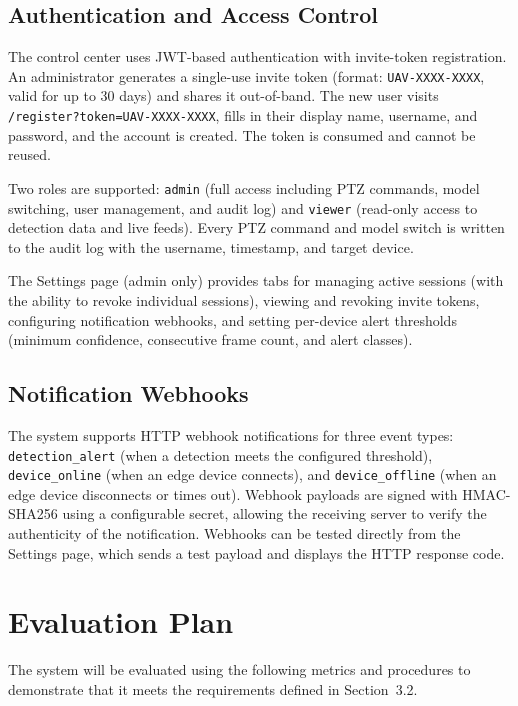 \documentclass[12pt,a4paper]{report}
\begin{document}
\subsection{Authentication and Access Control}

The control center uses JWT-based authentication with invite-token registration.
An administrator generates a single-use invite token (format: \texttt{UAV-XXXX-XXXX},
valid for up to 30 days) and shares it out-of-band. The new user visits
\texttt{/register?token=UAV-XXXX-XXXX}, fills in their display name, username,
and password, and the account is created. The token is consumed and cannot be
reused.

Two roles are supported: \texttt{admin} (full access including PTZ commands,
model switching, user management, and audit log) and \texttt{viewer}
(read-only access to detection data and live feeds). Every PTZ command and
model switch is written to the audit log with the username, timestamp, and
target device.

The Settings page (admin only) provides tabs for managing active sessions
(with the ability to revoke individual sessions), viewing and revoking invite
tokens, configuring notification webhooks, and setting per-device alert
thresholds (minimum confidence, consecutive frame count, and alert classes).

\subsection{Notification Webhooks}

The system supports HTTP webhook notifications for three event types:
\texttt{detection\_alert} (when a detection meets the configured threshold),
\texttt{device\_online} (when an edge device connects), and
\texttt{device\_offline} (when an edge device disconnects or times out).
Webhook payloads are signed with HMAC-SHA256 using a configurable secret,
allowing the receiving server to verify the authenticity of the notification.
Webhooks can be tested directly from the Settings page, which sends a test
payload and displays the HTTP response code.

\section{Evaluation Plan}

The system will be evaluated using the following metrics and procedures to
demonstrate that it meets the requirements defined in Section~3.2.
\end{document}
